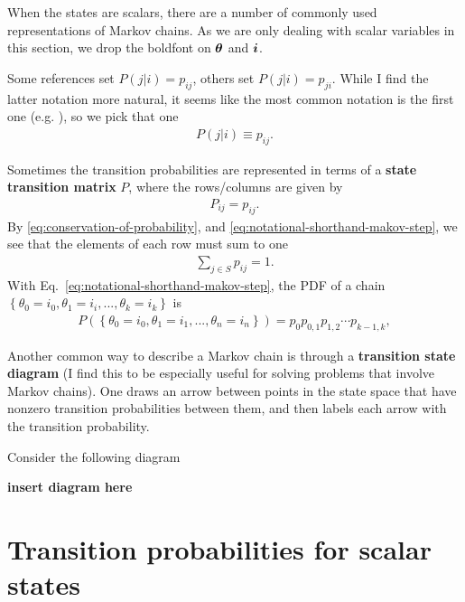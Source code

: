 When the states are scalars, there are a number of commonly used representations of Markov chains. 
As we are only dealing with scalar variables in this section, we drop the boldfont on ${\bm \theta}$ and ${\bm i}$.

Some references set $P\left(j|i\right) = p_{ij}$, others set $P\left(j|i\right) = p_{ji}$.
While I find the latter notation more natural, it seems like the most common notation is the first one (e.g. \cite{wasserman2010statistics,pishro2014introduction}), so we pick that one
\begin{align}
    \label{eq:notational-shorthand-makov-step}
    P\left(j|i\right)
    \equiv
    p_{ij}
    .
\end{align}

Sometimes the transition probabilities are represented in terms of a \textbf{state transition matrix} $P$, where the rows/columns are given by
\begin{align}
    P_{ij}
    =
    p_{ij}
    .
\end{align}
By \eqref{eq:conservation-of-probability}, and \eqref{eq:notational-shorthand-makov-step}, we see that the elements of each row must sum to one
\begin{align}
    \label{eq:rows-sum-to-one}
    \sum_{j\in S} p_{ij}
    =
    1
    .
\end{align}
With Eq.~\eqref{eq:notational-shorthand-makov-step}, the PDF of a chain $\left\{\theta_0=i_0, \theta_1=i_i, ... , \theta_k=i_k\right\}$ is
\begin{align}
    P\left(\left\{\theta_0=i_0, \theta_1=i_1, ... , \theta_n=i_n\right\}\right)
    =
    p_0 p_{0,1} p_{1,2} \cdots p_{k-1,k}
    ,
\end{align}

Another common way to describe a Markov chain is through a \textbf{transition state diagram} (I find this to be especially useful for solving problems that involve Markov chains).
One draws an arrow between points in the state space that have nonzero transition probabilities between them, and then labels each arrow with the transition probability.

Consider the following diagram

\textbf{insert diagram here}

\section{Transition probabilities for scalar states\label{sec:transition-probabilities}}

